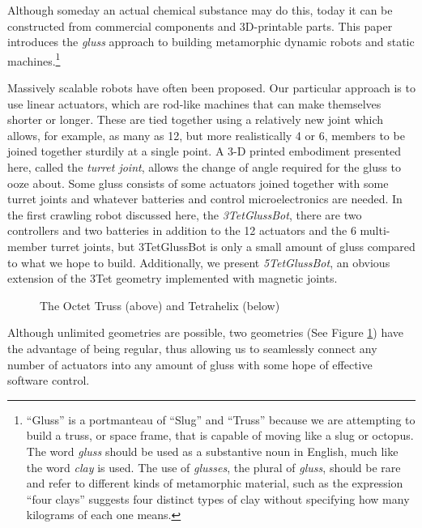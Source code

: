 \documentclass[11pt]{article}
\begin{document}
Although someday an actual chemical substance may do this, today it can be constructed from commercial components
and 3D-printable parts. This paper introduces the \emph{gluss} approach to building metamorphic dynamic robots
and static machines.\footnote{ ``Gluss'' is a portmanteau of ``Slug'' and ``Truss'' because we are attempting to
build a truss, or space frame, that is capable of moving like a slug or octopus.
The word \textit{gluss}
should be used as a substantive noun in English, much like the word \textit{clay} is used.
The use of \textit{glusses}, the plural
of \textit{gluss}, should be rare and refer to different kinds of metamorphic material, such as the expression
``four clays'' suggests four distinct types of clay without specifying how many kilograms of each one means.}

Massively scalable robots have often been proposed. Our particular approach is to use linear actuators,
which are rod-like machines that can make themselves shorter or longer. These are tied together using
a relatively new joint \cite{song2003spherical} which allows, for example, as many as 12, but more realistically 4 or 6,
members to be joined together sturdily at a single point.
A 3-D printed embodiment presented here, called the \emph{turret joint}, allows the
change of angle required for the gluss to ooze about. Some gluss consists of some actuators joined together
with some turret joints and whatever batteries and control microelectronics are needed. In the first
crawling robot discussed here, the \emph{3TetGlussBot}, there are two controllers and two batteries
in addition to the 12 actuators and the 6 multi-member turret joints, but 3TetGlussBot is only
a small amount of gluss compared to what we hope to build. Additionally, we present \emph{5TetGlussBot}, an obvious extension of the
3Tet geometry implemented with magnetic joints.

\begin{figure}[!ht]
  \centering
    \caption[The Octet Truss (above) and Tetrahelix (below)]{The Octet Truss (above) and Tetrahelix (below)}
      \label{twogeometries}
\end{figure}


Although unlimited geometries are possible, two geometries (See Figure \ref{twogeometries}) 
have the advantage of being regular, thus allowing us to
seamlessly connect any number of actuators into any amount of gluss with some hope of effective software control.
\end{document}
